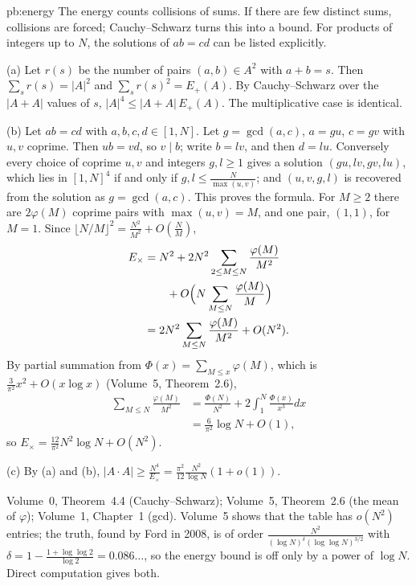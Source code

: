 \begin{solution}{pb:energy}
\idea The energy counts collisions of sums. If there are few distinct sums, collisions are forced; Cauchy--Schwarz turns this into a
bound. For products of integers up to $N$, the solutions of $ab=cd$ can be listed explicitly.

\writeup (a) Let $r(s)$ be the number of pairs $(a,b)\in A^2$ with $a+b=s$. Then $\sum_sr(s)=|A|^2$ and $\sum_sr(s)^2=E_+(A)$. By
Cauchy--Schwarz over the $|A+A|$ values of $s$, $|A|^4\le|A+A|\,E_+(A)$. The multiplicative case is identical.

(b) Let $ab=cd$ with $a,b,c,d\in[1,N]$. Let $g=\gcd(a,c)$, $a=gu$, $c=gv$ with $u,v$ coprime. Then $ub=vd$, so $v\mid b$; write $b=lv$, and then
$d=lu$. Conversely every choice of coprime $u,v$ and integers $g,l\ge1$ gives a solution $(gu,lv,gv,lu)$, which lies in $[1,N]^4$ if and only
if $g,l\le\frac N{\max(u,v)}$; and $(u,v,g,l)$ is recovered from the solution as $g=\gcd(a,c)$. This proves the formula. For $M\ge2$ there
are $2\varphi(M)$ coprime pairs with $\max(u,v)=M$, and one pair, $(1,1)$, for $M=1$. Since $\lfloor N/M\rfloor^2=\frac{N^2}{M^2}+O(\frac NM)$,
\[
\begin{aligned}
E_\times&=N^2+2N^2\sum_{2\le M\le N}\frac{\varphi(M)}{M^2}\\
&\qquad+O\Bigl(N\sum_{M\le N}\frac{\varphi(M)}M\Bigr)\\
&=2N^2\sum_{M\le N}\frac{\varphi(M)}{M^2}+O(N^2).
\end{aligned}
\]
By partial summation from $\Phi(x)=\sum_{M\le x}\varphi(M)$, which is $\frac3{\pi^2}x^2+O(x\log x)$ (Volume~5, Theorem~2.6),
\[
\begin{aligned}
\sum_{M\le N}\frac{\varphi(M)}{M^2}&=\frac{\Phi(N)}{N^2}+2\int_1^N\frac{\Phi(x)}{x^3}dx\\
&=\frac6{\pi^2}\log N+O(1),
\end{aligned}
\]
so $E_\times=\frac{12}{\pi^2}N^2\log N+O(N^2)$.

(c) By (a) and (b), $|A\cdot A|\ge\frac{N^4}{E_\times}=\frac{\pi^2}{12}\frac{N^2}{\log N}(1+o(1))$.

\tools Volume~0, Theorem~4.4 (Cauchy--Schwarz); Volume~5, Theorem~2.6 (the mean of $\varphi$); Volume~1, Chapter~1 (gcd).
\leads Volume~5 shows that the table has $o(N^2)$ entries; the truth, found by Ford in 2008, is of order
$\frac{N^2}{(\log N)^{\delta}(\log\log N)^{3/2}}$ with $\delta=1-\frac{1+\log\log2}{\log2}=0.086\ldots$, so the energy bound is off only by a power of
$\log N$. Direct computation gives both.
\end{solution}

